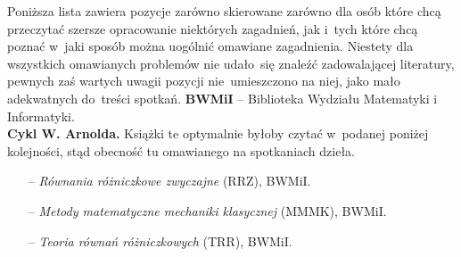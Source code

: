 \documentclass[a4paper,11pt]{article}
\begin{document}
\noindent
Poniższa lista zawiera pozycje zarówno skierowane zarówno dla osób
które chcą przeczytać szersze opracowanie niektórych zagadnień, jak
i~tych które chcą poznać w~jaki sposób można uogólnić omawiane
zagadnienia. Niestety dla wszystkich omawianych problemów nie
udało~się znaleźć zadowalającej \linebreak
literatury, pewnych zaś
wartych uwagii pozycji nie~umieszczono na niej, jako mało adekwatnych
do~treści spotkań. \newline
\noindent
\textbf{BWMiI} -- Biblioteka Wydziału Matematyki i Informatyki. \\
\newline
\noindent
\textbf{Cykl W. Arnolda.} Książki te optymalnie byłoby czytać
w~podanej poniżej kolejności, stąd obecność tu omawianego na
spotkaniach dzieła.
\begin{itemize}
\item[--] \emph{Równania różniczkowe zwyczajne} (RRZ), BWMiI.

\item[--] \emph{Metody matematyczne mechaniki klasycznej} (MMMK),
  BWMiI. %

\item[--] \emph{Teoria równań różniczkowych} (TRR), BWMiI.

\end{itemize}
\end{document}
